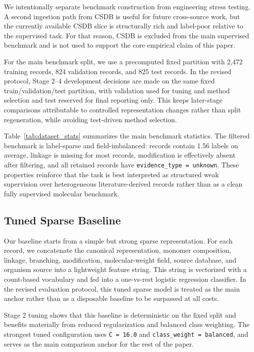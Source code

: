 \documentclass{article}
\begin{document}
We intentionally separate benchmark construction from engineering stress testing. A second ingestion path from CSDB is useful for future cross-source work, but the currently available CSDB slice is structurally rich and label-poor relative to the supervised task. For that reason, CSDB is excluded from the main supervised benchmark and is not used to support the core empirical claim of this paper.

For the main benchmark split, we use a precomputed fixed partition with 2,472 training records, 824 validation records, and 825 test records. In the revised protocol, Stage 2--4 development decisions are made on the same fixed train/validation/test partition, with validation used for tuning and method selection and test reserved for final reporting only. This keeps later-stage comparisons attributable to controlled representation changes rather than split regeneration, while avoiding test-driven method selection.

Table~\ref{tab:dataset_stats} summarizes the main benchmark statistics. The filtered benchmark is label-sparse and field-imbalanced: records contain 1.56 labels on average, linkage is missing for most records, modification is effectively absent after filtering, and all retained records have \texttt{evidence\_type = unknown}. These properties reinforce that the task is best interpreted as structured weak supervision over heterogeneous literature-derived records rather than as a clean fully supervised molecular benchmark.

\subsection{Tuned Sparse Baseline}
\label{sec:baseline}

Our baseline starts from a simple but strong sparse representation. For each record, we concatenate the canonical representation, monomer composition, linkage, branching, modification, molecular-weight field, source database, and organism source into a lightweight feature string. This string is vectorized with a count-based vocabulary and fed into a one-vs-rest logistic regression classifier. In the revised evaluation protocol, this tuned sparse model is treated as the main anchor rather than as a disposable baseline to be surpassed at all costs.

Stage 2 tuning shows that this baseline is deterministic on the fixed split and benefits materially from reduced regularization and balanced class weighting. The strongest tuned configuration uses \texttt{C = 16.0} and \texttt{class\_weight = balanced}, and serves as the main comparison anchor for the rest of the paper.
\end{document}
